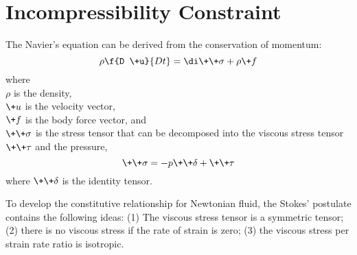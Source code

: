 \normalsize
\section{Incompressibility Constraint}

The Navier's equation \cite{Wilcox2003} can be derived from the conservation of momentum:
\begin{equation}
\rho \f{D \+u}{D t}=\di \+{\+\sigma} + \rho \+f
\end{equation}
where \\
$\rho$ is the density, \\
$\+u $ is the velocity vector, \\
$\+f $ is the body force vector, and \\
$\+{\+\sigma} $ is the stress tensor that can be decomposed into the viscous stress tensor $\+{\+\tau} $ and the pressure, \\
\begin{equation}
\+{\+\sigma} = -p \+{\+\delta} + \+{\+\tau}
\end{equation}
where $\+{\+\delta}$ is the identity tensor.

To develop the constitutive relationship for Newtonian fluid, the Stokes' postulate \cite{Stokes1845,Batchelor1967,Panton1996,White1991} contains the following ideas: (1) The viscous stress tensor is a symmetric tensor; (2) there is no viscous stress if the rate of strain is zero; (3) the viscous stress per strain rate ratio is isotropic.

